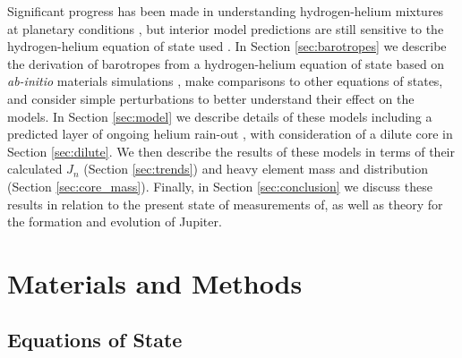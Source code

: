 Significant progress has been made in understanding hydrogen-helium mixtures at
planetary conditions
\citep{saumon1995,Saumon2004,Vorberger2007,Militzer2008,Fortney2010,Nettelmann2012,militzer2013a,becker2013,militzer2016},
but interior model predictions are still sensitive to the hydrogen-helium
equation of state used \citep{hubbard2016,miguel2016}. 
In Section \ref{sec:barotropes} we describe the derivation of barotropes from a
hydrogen-helium equation of state based on \textit{ab-initio} materials
simulations \citep{militzer2013a,hubbard2016}, make comparisons to other
equations of states, and consider simple perturbations to better understand
their effect on the models. In Section \ref{sec:model} we describe details of
these models including a predicted layer of ongoing helium rain-out
\citep{stevenson1977a,stevenson1977b,Morales2009,Lorenzen2009,Wilson2010,morales2013},
with consideration of a dilute core in Section \ref{sec:dilute}. We then
describe the results of these models in terms of their calculated $J_n$
(Section \ref{sec:trends}) and heavy element mass and distribution (Section
\ref{sec:core_mass}). Finally, in Section \ref{sec:conclusion} we discuss these
results in relation to the present state of  measurements of, as well as theory
for the formation and evolution of Jupiter.

\section{Materials and Methods} \label{sec:methods}

\subsection{Equations of State}

